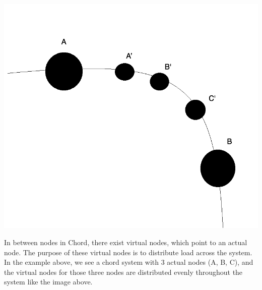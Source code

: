 \documentclass[twoside]{article}
\begin{document}
\begin{center}
\includegraphics{chord_virtual_nodes.png}
\end{center}

In between nodes in Chord, there exist virtual nodes, which point to an actual node. The purpose of these virtual nodes is to distribute load across the system. In the example above, we see a chord system with 3 actual nodes (A, B, C), and the virtual nodes for those three nodes are distributed evenly throughout the system like the image above. 

\nocite{*}
 

\end{document}

